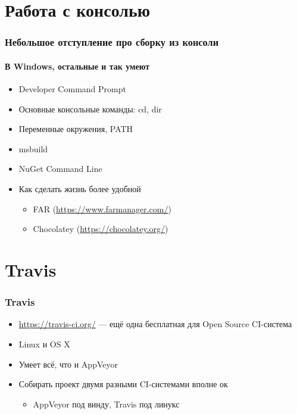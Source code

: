 \documentclass[xetex,mathserif,serif]{beamer}
\begin{document}
	\section{Работа с консолью}

	\begin{frame}
		\frametitle{Небольшое отступление про сборку из консоли}
		\framesubtitle{В Windows, остальные и так умеют}
		\begin{itemize}
			\item Developer Command Prompt
			\item Основные консольные команды: cd, dir
			\item Переменные окружения, PATH
			\item msbuild
			\item NuGet Command Line
			\item Как сделать жизнь более удобной
			\begin{itemize}
				\item FAR (\url{https://www.farmanager.com/})
				\item Chocolatey (\url{https://chocolatey.org/})
			\end{itemize}
		\end{itemize}
	\end{frame}

	\section{Travis}

	\begin{frame}
		\frametitle{Travis}
		\begin{itemize}
			\item \url{https://travis-ci.org/} --- ещё одна бесплатная для Open Source CI-система
			\item Linux и OS X
			\item Умеет всё, что и AppVeyor
			\item Собирать проект двумя разными CI-системами вполне ок
			\begin{itemize}
				\item AppVeyor под винду, Travis под линукс
			\end{itemize}
		\end{itemize}
	\end{frame}
\end{document}
